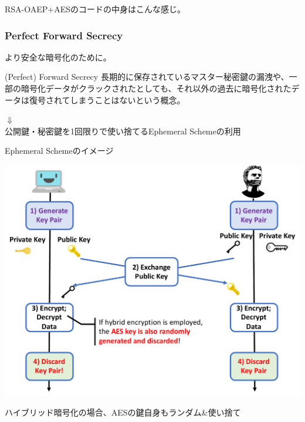 \documentclass[12pt,dvipdfmx]{beamer}
\begin{document}
\begin{frame}
RSA-OAEP+AESのコードの中身はこんな感じ。
\end{frame}

\begin{frame}
 
\end{frame}

\begin{frame}
\frametitle{Perfect Forward Secrecy}
より安全な暗号化のために。

\begin{block}{\small (Perfect) Forward Secrecy}
長期的に保存されているマスター秘密鍵の漏洩や、一部の暗号化データがクラックされたとしても、\alert{それ以外の過去に暗号化されたデータは復号されてしまうことはない}という概念。
\end{block}

\begin{center}
$\Downarrow$\\[1ex]

公開鍵・秘密鍵を1回限りで使い捨てる\alert{Ephemeral Scheme}の利用
\end{center}

\end{frame}

\begin{frame}
 Ephemeral Schemeのイメージ

\begin{center}
 \includegraphics[width=0.8\linewidth]{Figs/ephemeral-scheme-flow01.pdf}
\end{center}
ハイブリッド暗号化の場合、\alert{AESの鍵自身もランダム\&使い捨て}
\end{frame}
\end{document}

